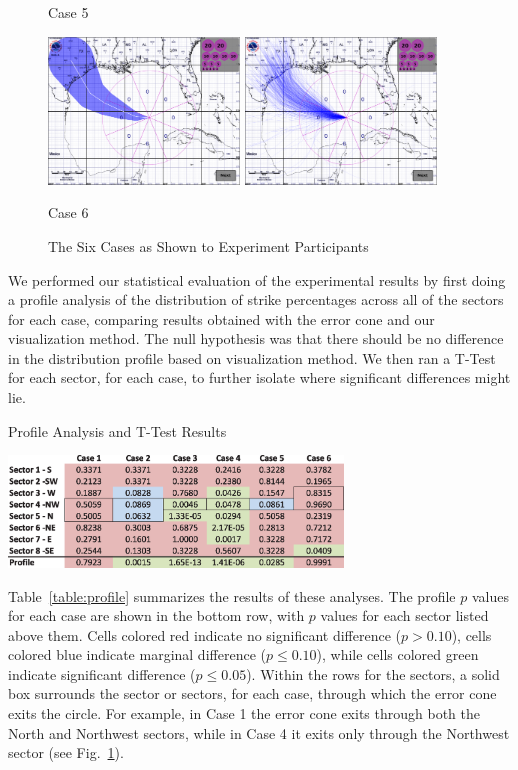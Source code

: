 \documentclass[journal]{vgtc}                %
\begin{document}
\begin{figure}[pt]
{{       \centerline{\small Case 5}}
       \hspace{1em}
    \parbox[b]{2in}{
       \includegraphics[width=2.0in]{figures/case_6_1.eps}
       \includegraphics[width=2.0in]{figures/case_6_0.eps}
       \centerline{\small Case 6}} 
   }

 \caption{The Six Cases as Shown to Experiment Participants}
 \label{fig:6cases_comp}
\end{figure}

We performed our statistical evaluation of the experimental results by first doing a profile analysis of the distribution of strike percentages across all of the sectors for each case, comparing results obtained with the error cone and our visualization method. The null hypothesis was that there should be no difference
in the distribution profile based on visualization method. We then ran a T-Test for each sector, for each case, to further isolate where
significant differences might lie. 

\begin{table}[htb]
  \caption{Profile Analysis and T-Test Results}
  \centering
  \includegraphics[width=3.5in]{figures/results_profile.eps}
  \label{table:profile}
\end{table}

Table~\ref{table:profile} summarizes the results of these analyses. 
The profile $p$ values for each case are shown in the bottom row, with $p$ values for each sector listed above them.
Cells colored red indicate no significant
difference ($p > 0.10$), cells colored blue indicate marginal difference ($p \le 0.10$), while cells colored green indicate significant
difference ($p \le 0.05$). 
Within the rows for the sectors, a solid box surrounds the sector or sectors, for each case, through which the error cone exits the circle. 
For example,
in Case 1 the error cone exits through both the North and Northwest sectors, while in Case 4 it exits only through the Northwest sector
(see Fig.~\ref{fig:6cases_comp}).
\end{document}

